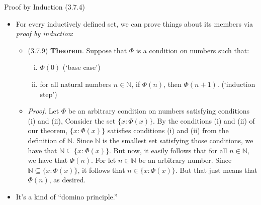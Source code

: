 \documentclass[../slides.tex]{subfiles}
\begin{document}
\begin{frame}{Proof by Induction (3.7.4)}

	\begin{itemize}
	
	
		\item For every inductively defined set, we can prove things about its members via \emph{proof by induction}:
		
		\begin{itemize}
		
			\item (3.7.9) \textbf{Theorem}. Suppose that $\Phi$ is a condition on numbers such that:
		\begin{enumerate}[(i)]
		
			\item $\Phi(0)$ (`base case')
			
			\item for all natural numbers $n\in\mathbb{N}$, if $\Phi(n)$, then $\Phi(n+1)$. (`induction step')
		
		\end{enumerate}
		
		\item \emph{Proof}. Let $\Phi$ be an arbitrary condition on numbers satisfying conditions (i) and (ii), Consider the set $\{x:\Phi(x)\}$. By the conditions (i) and (ii) of our theorem, $\{x:\Phi(x)\}$ satisfies conditions (i) and (ii) from the definition of $\mathbb{N}$. Since $\mathbb{N}$ is the smallest set satisfying those conditions, we have that $\mathbb{N}\subseteq\{x:\Phi(x)\}$. But now, it easily follows that for all $n\in\mathbb{N}$, we have that $\Phi(n)$. For let $n\in\mathbb{N}$ be an arbitrary number. Since $\mathbb{N}\subseteq\{x:\Phi(x)\}$, it follows that $n\in\{x:\Phi(x)\}$. But that just means that $\Phi(n)$, as desired.
		
		\end{itemize}
		
		\item It's a kind of ``domino principle.''
	
	\end{itemize}


\end{frame}
\end{document}
